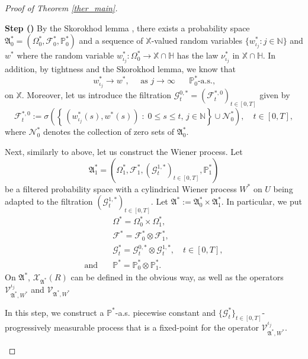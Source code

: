 \documentclass[english,a4paper,11pt]{amsart}
\theoremstyle{plain}
\theoremstyle{definition}
\theoremstyle{remark}
\numberwithin{equation}{section}
\newcounter{lil1}
\newenvironment{step}
{\begin{list} { \bf Step (\Roman{lil1})}
		{ \usecounter{lil1}
			\setlength{\leftmargin}{0.0cm}
			\setlength{\topsep}{0.2cm}
			\setlength{\itemsep}{0.0cm}
			\setlength{\parsep}{0.1cm}
			\setlength{\itemindent}{0.8cm}
			\setlength{\parskip}{0.0cm}}}
	{\end{list}}
\newcounter{lil33}
\newcounter{lil1q}
\newcommand{\CG}{{{ \mathcal G }}}
\newcommand{\CF}{{{ \mathcal F }}}
\newcommand{\CN}{{{ \mathcal N }}}
\newcommand{\NN}{\mathbb{N}}
\newcommand{\PP}{{\mathbb{P}}}
\renewcommand{\P}{\mathbb{P}}
\newcommand{\X}{\mathbb{X}}
\begin{document}
\begin{proof}[Proof of Theorem \ref{ther_main}]
\begin{step}
By the Skorokhod lemma \cite[Theorem 4.30]{Kallenberg},
there exists a probability space $\mathfrak{A}^\ast_0=(\Omega^\ast_0,\CF^{\ast}_0,\PP^\ast_0)$ and a  sequence of $\mathbb{X}$-valued random variables $\{ {w}^\ast_{\iota_j}:j\in\NN\}$
and ${w}^\ast$ where
the random variable $w^\ast_{\iota_j}:\Omega^\ast_0\to\mathbb{X}\cap\mathbb{H}$ has the  law $\nu^\ast_{\iota_j}$ in $\mathbb{X}\cap\mathbb{H}$.
In addition, by tightness and the Skorokhod lemma, we know that 
\begin{equation*}
{w}^\ast_{\iota_j}\to{w}^\ast,\quad \mbox{ as  $j\to \infty$ }\quad  {\P}^\ast_0\text{-a.s.,}
\end{equation*}
on $\X$.
%				
Moreover, let us introduce the filtration $\mathcal{G}^{0,\ast}_t=(\mathcal{F}_t^{\ast,0})_{t\in[0,T]}$  given by
$$
\CF^{\ast,0}_t:=\sigma \left( \left\{\,(w _{\iota_j}^\ast(s),w^\ast(s))\;\colon\; 0\le s\le t, \,j\in\NN \right\}\cup \CN_0^\ast\right),\quad t\in [0,T],
$$
where $\CN_0^\ast$ denotes the collection of zero sets of ${\mathfrak{A}}_0^\ast$.

Next, similarly to above, let us construct the Wiener process.
Let 
$$
\mathfrak{A}_1^\ast=\left(\Omega_1^\ast,\CF_1^\ast,(\mathcal{G}_t^{1,\ast})_{t\in [0,T]},\PP_1^\ast\right)
$$
be a filtered probability space with a cylindrical Wiener process $W^\ast$ on $U$ being adapted to the filtration $(\mathcal{G}_t^{1,\ast})_{t\in [0,T]}$. 				Let $\mathfrak{A}^\ast:=\mathfrak{A}_0^\ast\times \mathfrak{A}_1^\ast$.	
In particular, we put
\begin{align*}
&\Omega ^\ast=  \Omega_0^\ast\times \Omega^\ast_1,
\\
&\CF^\ast = \CF_0^\ast\otimes \CF_1^\ast,
\\
&\CG^\ast_t = \CG^{0,\ast}_t\otimes \CG^{1,\ast}_t,\quad t\in [0,T],
\\
\mbox{and}\quad &\PP^\ast = \PP^\ast_0\otimes \PP_1^\ast.
\end{align*}
On $\mathfrak{A}^\ast$, $\mathcal{X}_{\mathfrak{A}^\ast}(R)$ can be defined in the obvious way, as well as the operators $\mathcal{V}^{\iota_j}_{\mathfrak{A}^\ast,W^\ast}$
and ${\mathcal{V}}_{\mathfrak{A}^\ast,W^\ast}$

\item

In this step, we construct a $\P^\ast$-a.s. piecewise constant and $\{\CG^\ast_t\}_{t\in [0,T]}$-progressively measurable process that is a fixed-point for the operator $\mathcal{V}_{\mathfrak{A}^\ast,W^\ast}^{\iota_j}$.


\end{step}
\end{proof}
\end{document}
